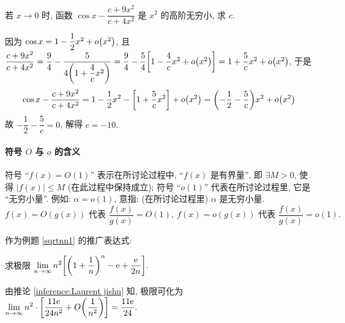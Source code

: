 \begin{example}
    若 $x\to0$ 时, 函数 $\cos x-\dfrac{c+9x^2}{c+4x^2}$ 是 $x^2$ 的高阶无穷小, 求 $c$.
\end{example}
\begin{solution}
    因为 $\cos x=1-\dfrac{1}{2}x^2+o\qty(x^2)$, 且 $\dfrac{c+9x^2}{c+4x^2}=\dfrac{9}{4}-\dfrac{5}{4\qty(1+\dfrac{4}{c}x^2)}=\dfrac{9}{4}-\dfrac{5}{4}\qty[1-\dfrac{4}{c}x^2+o\qty(x^2)]=1+\dfrac{5}{c}x^2+o\qty(x^2)$, 于是
    $$\cos x-\dfrac{c+9x^2}{c+4x^2}=1-\dfrac{1}{2}x^2-\qty[1+\dfrac{5}{c}x^2]+o\qty(x^2)=\qty(-\dfrac{1}{2}-\dfrac{5}{c})x^2+o\qty(x^2)$$
    故 $-\dfrac{1}{2}-\dfrac{5}{c}=0$, 解得 $c=-10.$
\end{solution}

\paragraph{符号 $O$ 与 $o$ 的含义}
符号 “$f(x)=O(1)$” 表示在所讨论过程中, “$f(x) $ 是有界量”, 即 $ \exists M>0$, 使得 $ |f(x)| \leqslant M $ (在此过程中保持成立);
符号 “$o(1)$” 代表在所讨论过程里, 它是 “无穷小量”. 例如: $ \alpha=o(1) $, 意指: (在所讨论过程里) $\alpha $ 是无穷小量.
$$f(x)=O(g(x)) \text{ 代表 } \dfrac{f(x)}{g(x)}=O(1),~f(x)=o(g(x))\text{ 代表 }\dfrac{f(x)}{g(x)}=o(1).$$

\begin{inference}[Laurent  级数]\label{inference:Laurent jishu}
    作为例题 \ref{sqrtnn1} 的推广表达式:
\end{inference}

\begin{example}
    求极限 $\displaystyle\lim_{n\to\infty}n^2\qty[\qty(1+\dfrac{1}{n})^n-\mathrm{e}+\dfrac{\mathrm{e}}{2n}].$
\end{example}
\begin{solution}
    由推论 \ref{inference:Laurent jishu} 知, 极限可化为 $\displaystyle\lim_{n\to\infty}n^2\cdot\qty[\dfrac{11\mathrm{e}}{24n^2}+O\qty(\dfrac{1}{n^2})]=\dfrac{11\mathrm{e}}{24}.$
\end{solution}

